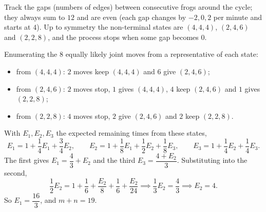 Track the gaps (numbers of edges) between consecutive frogs around the cycle; they always sum to $12$ and are even (each gap changes by $-2,0,2$ per minute and starts at $4$). Up to symmetry the non-terminal states are $(4,4,4)$, $(2,4,6)$ and $(2,2,8)$, and the process stops when some gap becomes $0$.

Enumerating the $8$ equally likely joint moves from a representative of each state:
\begin{itemize}
\item from $(4,4,4)$: $2$ moves keep $(4,4,4)$ and $6$ give $(2,4,6)$;
\item from $(2,4,6)$: $2$ moves stop, $1$ gives $(4,4,4)$, $4$ keep $(2,4,6)$ and $1$ gives $(2,2,8)$;
\item from $(2,2,8)$: $4$ moves stop, $2$ give $(2,4,6)$ and $2$ keep $(2,2,8)$.
\end{itemize}
With $E_1,E_2,E_3$ the expected remaining times from these states,
\[E_1=1+\dfrac14E_1+\dfrac34E_2,\qquad E_2=1+\dfrac18E_1+\dfrac12E_2+\dfrac18E_3,\qquad E_3=1+\dfrac14E_2+\dfrac14E_3.\]
The first gives $E_1=\dfrac43+E_2$ and the third $E_3=\dfrac{4+E_2}{3}$. Substituting into the second,
\[\dfrac12E_2=1+\dfrac16+\dfrac{E_2}8+\dfrac16+\dfrac{E_2}{24}\implies\dfrac13E_2=\dfrac43\implies E_2=4.\]
So $E_1=\dfrac{16}3$, and $m+n=\boxed{19}$.
